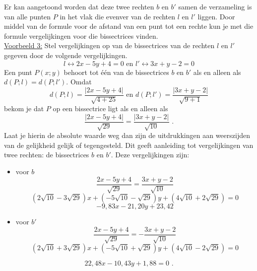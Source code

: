 Er kan aangetoond worden dat deze twee rechten $b$ en $b'$ samen de verzameling is van alle punten $P$ in het vlak die evenver van de rechten $l$ en $l'$ liggen.
Door middel van de formule voor de afstand van een punt tot een rechte kun je met die formule vergelijkingen voor die bissectrices vinden.\\

\noindent \underline{Voorbeeld 3:} Stel vergelijkingen op van de bissectrices van de rechten $l$ en $l'$ gegeven door de volgende vergelijkingen.
\[
l \leftrightarrow 2x-5y+4=0 \text { en } l' \leftrightarrow3x+y-2=0 
\]
Een punt $P(x;y)$ behoort tot \'e\'en van de bissectrices $b$ en $b'$ als en alleen als $d(P;l)=d(P;l')$.
Omdat
\[
d(P;l)=\frac { \vert 2x-5y+4 \vert }{\sqrt {4 + 25}} \text { en } d(P;l')=\frac { \vert 3x+y-2 \vert }{\sqrt {9+1}}
\]
bekom je dat $P$ op een bissectrice ligt als en alleen als
\[
\frac { \vert 2x-5y+4 \vert }{\sqrt {29}}=\frac { \vert 3x+y-2 \vert }{\sqrt {10}} \text { .}
\]
Laat je hierin de absolute waarde weg dan zijn de uitdrukkingen aan weerszijden van de gelijkheid gelijk of tegengesteld.
Dit geeft aanleiding tot vergelijkingen van twee rechten: de bissectrices $b$ en $b'$.
Deze vergelijkingen zijn:
\begin{itemize}
\item  voor $b$
\[
\frac {2x-5y+4}{\sqrt {29}}=\frac {3x+y-2}{\sqrt {10 }}
\]
\[
(2\sqrt {10}-3\sqrt {29})x+(-5\sqrt {10}-\sqrt {29})y+(4\sqrt {10}+2\sqrt {29})=0
\]
\[
-9,83x-21,20y+23,42
\]
\item voor $b'$
\[
\frac {2x-5y+4}{\sqrt {29}}=-\frac {3x+y-2}{\sqrt {10}}
\]
\[
(2\sqrt {10}+3\sqrt {29})x+(-5\sqrt{10}+\sqrt{29})y+(4\sqrt{10}-2\sqrt{29})=0
\]
\end{itemize}
\[
22,48x-10,43y+1,88=0 \text { .}
\]
